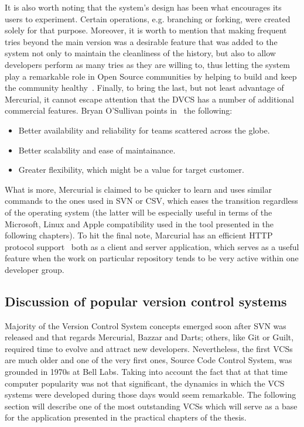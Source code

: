 It is also worth noting that the system's design has been what encourages its users to experiment. Certain operations, e.g. branching or forking, were created solely for that purpose. Moreover, it is worth to mention that making frequent tries beyond the main version was a desirable feature that was added to the system not only to maintain the cleanliness of the history, but also to allow developers perform as many tries as they are willing to, thus letting the system play a remarkable role in Open Source communities by helping to build and keep the community healthy~\cite{git_talk,svn_talk}. Finally, to bring the last, but not least advantage of Mercurial, it cannot escape attention that the DVCS has a number of additional commercial features. Bryan O'Sullivan points in~\cite[page 6]{hg_book} the following: 
\begin{itemize}
\item{Better availability and reliability for teams scattered across the globe.}
\item{Better scalability and ease of maintainance.}
\item{Greater flexibility, which might be a value for target customer.}
\end{itemize}
What is more, Mercurial is claimed to be quicker to learn and uses similar commands to the ones used in SVN or CSV, which eases the transition regardless of the operating system (the latter will be especially useful in terms of the Microsoft, Linux and Apple compatibility used in the tool presented in the following chapters). To hit the final note, Marcurial has an efficient HTTP protocol support~\cite{google_hg_git_compare} both as a client and server application, which serves as a useful feature when the work on particular repository tends to be very active within one developer group.

\subsection{Discussion of popular version control systems}\label{subsec:dvcs_compare}
Majority of the Version Control System concepts emerged soon after SVN was released and that regards Mercurial, Bazzar and Darts; others, like Git or Guilt, required time to evolve and attract new developers. Nevertheless, the first VCSs are much older and one of the very first ones, Source Code Control System, was grounded in 1970s at Bell Labs. Taking into account the fact that at that time computer popularity was not that significant, the dynamics in which the VCS systems were developed during those days would seem remarkable. The following section will describe one of the most outstanding VCSs which will serve as a base for the application presented in the practical chapters of the thesis.

